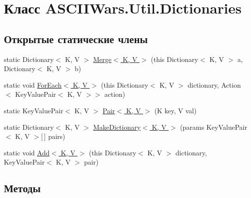 \hypertarget{class_a_s_c_i_i_wars_1_1_util_1_1_dictionaries}{}\section{Класс A\+S\+C\+I\+I\+Wars.\+Util.\+Dictionaries}
\label{class_a_s_c_i_i_wars_1_1_util_1_1_dictionaries}
\subsection*{Открытые статические члены}
\begin{DoxyCompactItemize}
\item 
static Dictionary$<$ K, V $>$ \hyperlink{class_a_s_c_i_i_wars_1_1_util_1_1_dictionaries_a687b7596776083fdad1492e8466cffc3}{Merge$<$ K, V $>$} (this Dictionary$<$ K, V $>$ a, Dictionary$<$ K, V $>$ b)
\item 
static void \hyperlink{class_a_s_c_i_i_wars_1_1_util_1_1_dictionaries_a74c26eb2b4f333fabf83471b63444bcf}{For\+Each$<$ K, V $>$} (this Dictionary$<$ K, V $>$ dictionary, Action$<$ Key\+Value\+Pair$<$ K, V $>$$>$ action)
\item 
static Key\+Value\+Pair$<$ K, V $>$ \hyperlink{class_a_s_c_i_i_wars_1_1_util_1_1_dictionaries_aa4374015be0400ad808586251d9a89cc}{Pair$<$ K, V $>$} (K key, V val)
\item 
static Dictionary$<$ K, V $>$ \hyperlink{class_a_s_c_i_i_wars_1_1_util_1_1_dictionaries_a388efc7bcd0f011123c6d988104a5b29}{Make\+Dictionary$<$ K, V $>$} (params Key\+Value\+Pair$<$ K, V $>$\mbox{[}$\,$\mbox{]} pairs)
\item 
static void \hyperlink{class_a_s_c_i_i_wars_1_1_util_1_1_dictionaries_ac76817b42c3d6ac7e50729b4f3f0cd9a}{Add$<$ K, V $>$} (this Dictionary$<$ K, V $>$ dictionary, Key\+Value\+Pair$<$ K, V $>$ pair)
\end{DoxyCompactItemize}


\subsection{Методы}
\hypertarget{class_a_s_c_i_i_wars_1_1_util_1_1_dictionaries_ac76817b42c3d6ac7e50729b4f3f0cd9a}{}\label{class_a_s_c_i_i_wars_1_1_util_1_1_dictionaries_ac76817b42c3d6ac7e50729b4f3f0cd9a} 
